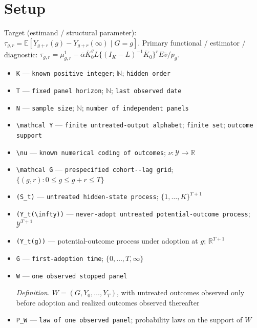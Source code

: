 \documentclass{article}
\begin{document}
\section{Setup}

Target (estimand / structural parameter): \(\tau_{g,r}=\mathbb E[Y_{g+r}(g)-Y_{g+r}(\infty)\mid G=g]\).
Primary functional / estimator / diagnostic: \(\tau_{g,r}=\mu^1_{g,r}-\bar\alpha\bar K_0^gL\{(I_K-L)^{-1}\bar K_0\}^{r}E\bar v/p_g\).
\begin{itemize}
  \item \texttt{K} --- \texttt{known positive integer}; \(\mathbb N\); \texttt{hidden order}
  \item \texttt{T} --- \texttt{fixed panel horizon}; \(\mathbb N\); \texttt{last observed date}
  \item \texttt{N} --- \texttt{sample size}; \(\mathbb N\); \texttt{number of independent panels}
  \item \texttt{\textbackslash{}\allowbreak{}mathcal Y} --- \texttt{finite untreated-\allowbreak{}output alphabet}; \texttt{finite set}; \texttt{outcome support}
  \item \texttt{\textbackslash{}\allowbreak{}nu} --- \texttt{known numerical coding of outcomes}; \(\nu:\mathcal Y\to\mathbb R\)
  \item \texttt{\textbackslash{}\allowbreak{}mathcal G} --- \texttt{prespecified cohort-\allowbreak{}-\allowbreak{}lag grid}; \(\{(g,r):0\le g\le g+r\le T\}\)
  \item \texttt{(S\_\allowbreak{}t)} --- \texttt{untreated hidden-\allowbreak{}state process}; \(\{1,\ldots,K\}^{T+1}\)
  \item \texttt{(Y\_\allowbreak{}t(\textbackslash{}\allowbreak{}infty))} --- \texttt{never-\allowbreak{}adopt untreated potential-\allowbreak{}outcome process}; \(\mathcal Y^{T+1}\)
  \item \texttt{(Y\_\allowbreak{}t(g))} --- potential-outcome process under adoption at \(g\); \(\mathbb R^{T+1}\)
  \item \texttt{G} --- \texttt{first-\allowbreak{}adoption time}; \(\{0,\ldots,T,\infty\}\)
  \item \texttt{W} --- \texttt{one observed stopped panel}
  \par\smallskip\noindent\emph{Definition.} \(W=(G,Y_0,\ldots,Y_T)\), with untreated outcomes observed only before adoption and realized outcomes observed thereafter
  \item \texttt{P\_\allowbreak{}W} --- \texttt{law of one observed panel}; probability laws on the support of \(W\)

\end{itemize}
\end{document}
